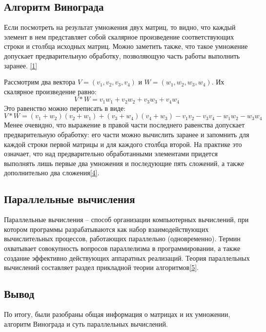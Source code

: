 \documentclass[14pt, a4paper]{extarticle}
\begin{document}
	\subsection{Алгоритм Винограда}
	Если посмотреть на результат умножения двух матриц, то видно, что каждый элемент в нем представляет собой скалярное произведение соответствующих строки и столбца исходных матриц. Можно заметить также, что такое умножение допускает предварительную обработку, позволяющую часть работы выполнить заранее. \hyperref[literature]{[1]}\par
	Рассмотрим два вектора $V = (v_{1},v_{2},v_{3},v_{4})$ и $W = (w_{1},w_{2},w_{3},w_{4})$. Их скалярное произведение равно:
	\begin{equation}
		V * W = v_{1}w_{1} + v_{2}w_{2} + v_{3}w_{3} + v_{4}w_{4}
	\end{equation}
	Это равенство можно переписать в виде:
	\begin{equation}
		V * W = (v_{1} + w_{2})(v_{2} + w_{1}) + (v_{3} + w_{4})(v_{4} + w_{3}) -  v_{1}v_{2} - v_{3}v_{4} - w_{1}w_{2} - w_{3}w_{4}
	\end{equation}
	Менее очевидно, что выражение в правой части последнего равенства допускает предварительную обработку: его части можно вычислить заранее и запомнить для каждой строки первой матрицы и для каждого столбца второй. На практике это означает, что над предварительно обработанными элементами придется выполнять лишь первые два умножения и последующие пять сложений, а также дополнительно два сложения\hyperref[MatrixInfo]{[4]}. 
	
	
	\subsection{Параллельные вычисления}
	Параллельные вычисления – способ организации компьютерных вычислений, при котором программы разрабатываются как набор взаимодействующих вычислительных процессов, работающих параллельно (одновременно). Термин охватывает совокупность вопросов параллелизма в программировании, а также создание эффективно действующих аппаратных реализаций. Теория параллельных вычислений составляет раздел прикладной теории алгоритмов\hyperref[ParInfo]{[5]}.

	
	\subsection*{Вывод}
	По итогу, были разобраны общая информация о матрицах и их умножении, алгоритм Винограда и суть параллельных вычислений.
	
\end{document}
